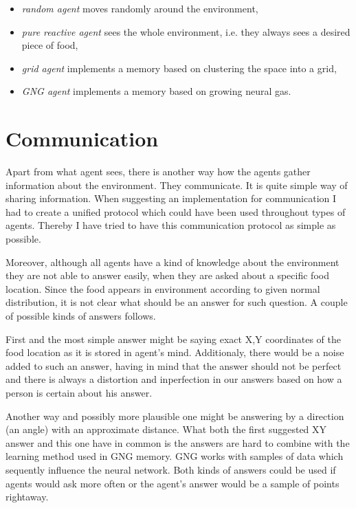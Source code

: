 \begin{itemize}
\item \emph{random agent} moves randomly around the environment,
\item \emph{pure reactive agent} sees the whole environment, i.e. they always sees a desired piece of food, 
\item \emph{grid agent} implements a memory based on clustering the space into a grid,
\item \emph{GNG agent} implements a memory based on growing neural gas.
\end{itemize}

\section{Communication}

Apart from what agent sees, there is another way how the agents gather information about the environment. They communicate. It is quite simple way of sharing information. When suggesting an implementation for communication I had to create a unified protocol which could have been used throughout types of agents. Thereby I have tried to have this communication protocol as simple as possible.

Moreover, although all agents have a kind of knowledge about the environment they are not able to answer easily, when they are asked about a specific food location. Since the food appears in environment according to given normal distribution, it is not clear what should be an answer for such question. A couple of possible kinds of answers follows. 

First and the most simple answer might be saying exact X,Y coordinates of the food location as it is stored in agent's mind. Additionaly, there would be a noise added to such an answer, having in mind that the answer should not be perfect and there is always a distortion and inperfection in our answers based on how a person is certain about his answer.
                                              
Another way and possibly more plausible one might be answering by a direction (an angle) with an approximate distance. What both the first suggested XY answer and this one have in common is the answers are hard to combine with the learning method used in GNG memory. GNG works with samples of data which sequently influence the neural network. Both kinds of answers could be used if agents would ask more often or the agent's answer would be a sample of points rightaway.

